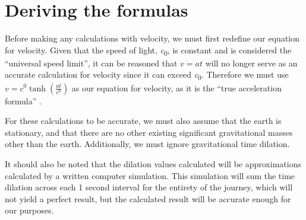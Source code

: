 \section{Deriving the formulas}
	Before making any calculations with velocity, we must first redefine our equation for velocity. Given that the speed of
	light, \si{\clight}, is constant and is considered the ``universal speed limit'', it can be reasoned that $v=at$ will no longer serve
	as an accurate calculation for velocity since it can exceed \si{\clight}. Therefore we must use $v=\si{\clight} \tanh\left(\frac{at}{\si{\clight}}\right)$ as our equation for 
	velocity, as it is the ``true acceleration formula'' \autocite{sracceleration}.

	For these calculations to be accurate, we must also assume that the earth is stationary, and that there are no other existing significant
	gravitational masses other than the earth. Additionally, we must ignore gravitational time dilation.

	It should also be noted that the dilation values calculated will be approximations calculated by a written computer simulation. This
	simulation will sum the time dilation across each 1 second interval for the entirety of the journey, which will not yield a perfect
	result, but the calculated result will be accurate enough for our purposes.
